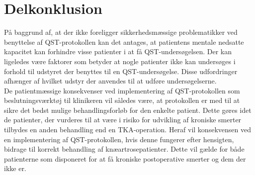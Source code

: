 \section{Delkonklusion}
På baggrund af, at der ikke foreligger sikkerhedsmæssige problematikker ved benyttelse af QST-protokollen kan det antages, at patientens mentale nedsatte kapacitet kan forhindre visse patienter i at få QST-undersøgelsen. Der kan ligeledes være faktorer som betyder at nogle patienter ikke kan undersøges i forhold til udstyret der benyttes til en QST-undersøgelse. Disse udfordringer afhænger af hvilket udstyr der anvendes til at udføre undersøgelserne.\\
De patientmæssige konsekvenser ved implementering af QST-protokollen som beslutningsværktøj til klinikeren vil således være, at protokollen er med til at sikre det bedst mulige behandlingsforløb for den enkelte patient. Dette gøres idet de patienter, der vurderes til at være i risiko for udvikling af kroniske smerter tilbydes en anden behandling end en TKA-operation. Heraf vil konsekvensen ved en implementering af QST-protokollen, hvis denne fungerer efter hensigten, bidrage til korrekt behandling af knæartrosepatienter. Dette vil gælde for både patienterne som disponeret for at få kroniske postoperative smerter og dem der ikke er.


